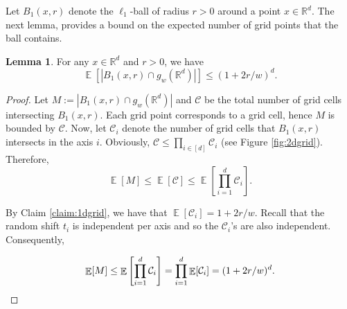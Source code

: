 \documentclass[10pt,a4paper,twoside]{book}
\newcommand{\rd}{\mathbb{R}^{d}}
\newcommand{\cell}{\mathcal{C}}
\DeclareMathOperator*{\EE}{\mathbb{E}}
\theoremstyle{definition}
\newtheorem{lemma}[definition]{Lemma}
\theoremstyle{remark}
\begin{document}
Let $B_1(x,r)$ denote the $\ell_1$-ball of radius $r>0$ around a point $x\in \rd$. The next lemma, provides a bound on the expected number of grid points that the ball contains.

\begin{lemma} \label{lemma:dgrid}
For any $x \in \rd$ and $r>0$, we have
\[ \EE[|B_1(x,r) \cap g_w(\rd)|] \leq (1+2r/w)^d.\]
\end{lemma}

\begin{proof}
Let $M := |B_1(x,r) \cap g_w(\rd)|$ and $\cell$ be the total number of grid cells intersecting $B_1(x,r)$. Each grid point corresponds to a grid cell, hence $M$ is bounded by $\cell$. Now, let $\cell_i$ denote the number of grid cells that $B_1(x,r)$ intersects in the axis $i$. Obviously, $\cell \leq \prod_{i \in [d]} \cell_i$ (see Figure \ref{fig:2dgrid}). Therefore,
\[ \EE[M] \leq \EE[\cell] \leq \EE \left[ \prod_{i=1}^d \cell_i \right]. \]

By Claim \ref{claim:1dgrid}, we have that $\EE[\cell_i] = 1+ 2r/w$. Recall that the random shift $t_i$ is independent per axis and so the $\cell_i$'s are also independent. Consequently,

\[ \EE[M] \leq \EE \left[ \prod_{i=1}^d \cell_i \right] = \prod_{i=1}^d \EE[\cell_i] = (1+2r/ w)^d. \qedhere\]
\end{proof}
\end{document}
